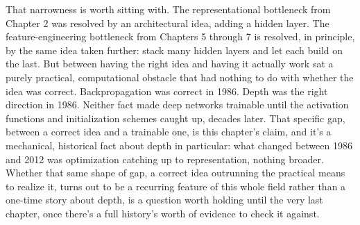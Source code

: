 That narrowness is worth sitting with. The representational bottleneck from Chapter 2 was resolved by an architectural idea, adding a hidden layer. The feature-engineering bottleneck from Chapters 5 through 7 is resolved, in principle, by the same idea taken further: stack many hidden layers and let each build on the last. But between having the right idea and having it actually work sat a purely practical, computational obstacle that had nothing to do with whether the idea was correct. Backpropagation was correct in 1986. Depth was the right direction in 1986. Neither fact made deep networks trainable until the activation functions and initialization schemes caught up, decades later. That specific gap, between a correct idea and a trainable one, is this chapter's claim, and it's a mechanical, historical fact about depth in particular: what changed between 1986 and 2012 was optimization catching up to representation, nothing broader. Whether that same shape of gap, a correct idea outrunning the practical means to realize it, turns out to be a recurring feature of this whole field rather than a one-time story about depth, is a question worth holding until the very last chapter, once there's a full history's worth of evidence to check it against.
